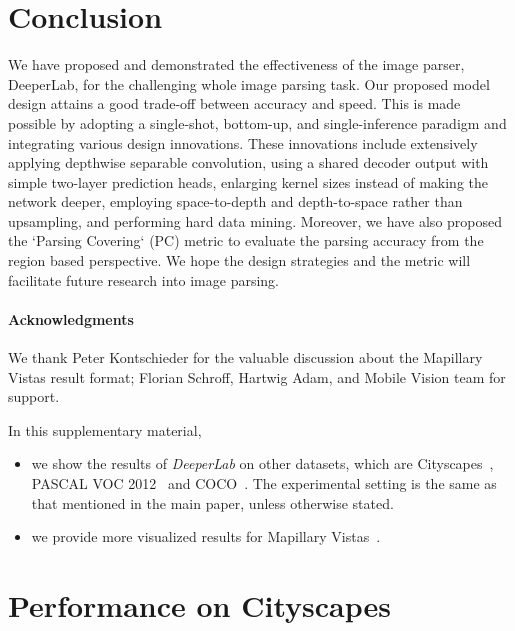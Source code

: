 \documentclass[10pt,twocolumn,letterpaper]{article}
\begin{document}
 
\section{Conclusion}
\label{sec:conclusion}

We have proposed and demonstrated the effectiveness of the image parser, DeeperLab, for the challenging whole image parsing task. Our proposed model design attains a good trade-off between accuracy and speed. This is made possible by adopting a single-shot, bottom-up, and single-inference paradigm and integrating various design innovations. These innovations include extensively applying depthwise separable convolution, using a shared decoder output with simple two-layer prediction heads, enlarging kernel sizes instead of making the network deeper, employing space-to-depth and depth-to-space rather than upsampling, and performing hard data mining. Moreover, we have also proposed the `Parsing Covering` (PC) metric to evaluate the parsing accuracy from the region based perspective. We hope the design strategies and the metric will facilitate future research into image parsing.

\paragraph{Acknowledgments}
We thank Peter Kontschieder for the valuable discussion about the Mapillary Vistas result format; Florian Schroff, Hartwig Adam, and Mobile Vision team for support. 


{\small


}



\clearpage
\appendix
In this supplementary material, 
\begin{itemize}
    \item we show the results of \emph{DeeperLab} on other datasets, which are Cityscapes~\cite{Cordts2016Cityscapes}, PASCAL VOC 2012~\cite{everingham2014pascal} and COCO~\cite{lin2014microsoft}. The experimental setting is the same as that mentioned in the main paper, unless otherwise stated.
    \item we provide more visualized results for Mapillary Vistas~\cite{Vemulapalli2016Gaussian}.
\end{itemize}

\section{Performance on Cityscapes}
\end{document}

